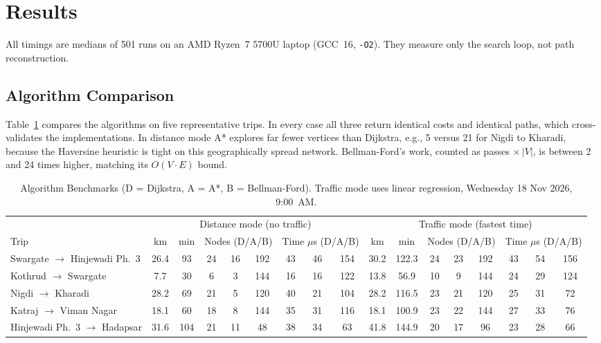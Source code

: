 \documentclass[conference]{IEEEtran}
\begin{document}
\section{Results}\label{sec:results}

All timings are medians of 501 runs on an AMD Ryzen~7 5700U laptop
(GCC~16, \texttt{-O2}). They measure only the search loop, not path
reconstruction.

\subsection{Algorithm Comparison}
Table~\ref{tab:bench} compares the algorithms on five representative
trips. In every case all three return identical costs and identical
paths, which cross-validates the implementations. In distance mode A*
explores far fewer vertices than Dijkstra, e.g., 5 versus 21 for Nigdi to
Kharadi, because the Haversine heuristic is tight on this geographically
spread network. Bellman-Ford's work, counted as passes $\times\,|V|$, is
between 2 and 24 times higher, matching its $O(V\cdot E)$ bound.

\begin{table}[t]
\caption{Algorithm Benchmarks (D = Dijkstra, A = A*, B = Bellman-Ford). Traffic mode uses linear regression, Wednesday 18 Nov 2026, 9:00~AM.}
\label{tab:bench}
\centering
\footnotesize
\setlength{\tabcolsep}{3.2pt}
\begin{tabular}{@{}l|cc|ccc|ccc||cc|ccc|ccc@{}}
\toprule
& \multicolumn{8}{c||}{Distance mode (no traffic)} & \multicolumn{8}{c}{Traffic mode (fastest time)} \\
Trip & km & min & \multicolumn{3}{c|}{Nodes (D/A/B)} & \multicolumn{3}{c||}{Time $\mu$s (D/A/B)} & km & min & \multicolumn{3}{c|}{Nodes (D/A/B)} & \multicolumn{3}{c}{Time $\mu$s (D/A/B)} \\
\midrule
Swargate $\to$ Hinjewadi Ph.~3 & 26.4 & 93  & 24 & 16 & 192 & 43 & 46 & 154 & 30.2 & 122.3 & 24 & 23 & 192 & 43 & 54 & 156 \\
Kothrud $\to$ Swargate         & 7.7  & 30  & 6  & 3  & 144 & 16 & 16 & 122 & 13.8 & 56.9  & 10 & 9  & 144 & 24 & 29 & 124 \\
Nigdi $\to$ Kharadi            & 28.2 & 69  & 21 & 5  & 120 & 40 & 21 & 104 & 28.2 & 116.5 & 23 & 21 & 120 & 25 & 31 & 72 \\
Katraj $\to$ Viman Nagar       & 18.1 & 60  & 18 & 8  & 144 & 35 & 31 & 116 & 18.1 & 100.9 & 23 & 22 & 144 & 27 & 33 & 76 \\
Hinjewadi Ph.~3 $\to$ Hadapsar & 31.6 & 104 & 21 & 11 & 48  & 38 & 34 & 63  & 41.8 & 144.9 & 20 & 17 & 96  & 23 & 28 & 66 \\
\bottomrule
\end{tabular}
\end{table}
\end{document}
